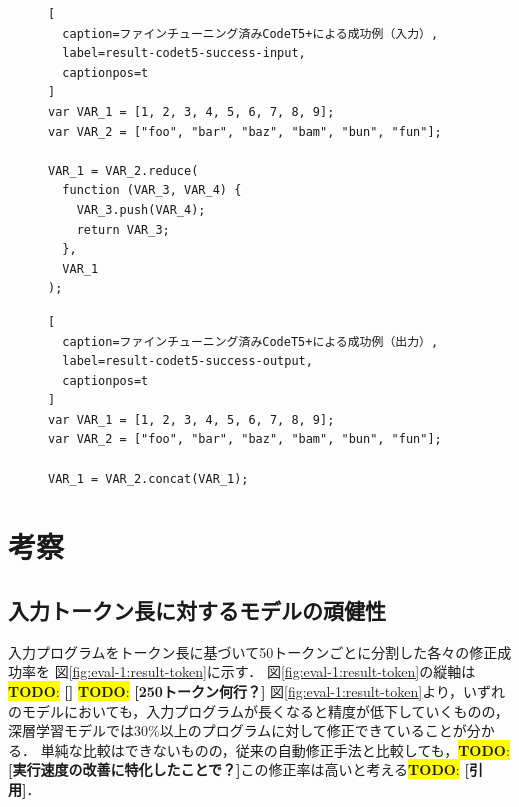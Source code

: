 \documentclass[11pt]{jreport}
\newcommand{\todo}[1]{\colorbox{yellow}{{\bf TODO}:}{\color{red} {\textbf{[#1]}}}}
\begin{document}
\begin{figure}[t]
\captionsetup{name=Listing}
\hspace{0.04\columnwidth}
\begin{minipage}[b]{0.96\linewidth}
\begin{lstlisting}[
  caption=ファインチューニング済みCodeT5+による成功例（入力）,
  label=result-codet5-success-input,
  captionpos=t
]
var VAR_1 = [1, 2, 3, 4, 5, 6, 7, 8, 9];
var VAR_2 = ["foo", "bar", "baz", "bam", "bun", "fun"];

VAR_1 = VAR_2.reduce(
  function (VAR_3, VAR_4) {
    VAR_3.push(VAR_4);
    return VAR_3;
  },
  VAR_1
);
\end{lstlisting}
\end{minipage}

\hspace{0.04\columnwidth}
\begin{minipage}[b]{0.96\linewidth}
\begin{lstlisting}[
  caption=ファインチューニング済みCodeT5+による成功例（出力）,
  label=result-codet5-success-output,
  captionpos=t
]
var VAR_1 = [1, 2, 3, 4, 5, 6, 7, 8, 9];
var VAR_2 = ["foo", "bar", "baz", "bam", "bun", "fun"];

VAR_1 = VAR_2.concat(VAR_1);
\end{lstlisting}
\end{minipage}
\end{figure}




\section{考察}




\subsection{入力トークン長に対するモデルの頑健性}


入力プログラムをトークン長に基づいて50トークンごとに分割した各々の修正成功率を
図\ref{fig:eval-1:result-token}に示す．
図\ref{fig:eval-1:result-token}の縦軸は\todo{}
\todo{250トークン何行？}
図\ref{fig:eval-1:result-token}より，いずれのモデルにおいても，入力プログラムが長くなると精度が低下していくものの，深層学習モデルでは30\%以上のプログラムに対して修正できていることが分かる．
単純な比較はできないものの，従来の自動修正手法と比較しても，\todo{実行速度の改善に特化したことで？}この修正率は高いと考える\todo{引用}．
\end{document}
